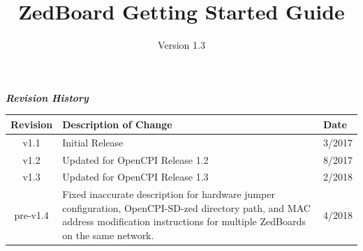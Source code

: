 \def\docTitle{ZedBoard Getting Started Guide}
\def\docVersion{1.3}

\date{Version \docVersion} %
\title{\docTitle}
\usepackage[T1]{fontenc} %
\usepackage{graphicx}
\graphicspath{ {figures/} }

\maketitle
\newpage

	\begin{center}
	\textit{\textbf{Revision History}}
		\begin{table}[H]
		\label{table:revisions} %
			\begin{tabularx}{\textwidth}{|c|X|l|}
			\hline
			\rowcolor{blue}
			\textbf{Revision} & \textbf{Description of Change} & \textbf{Date} \\
		    \hline
		    v1.1 & Initial Release & 3/2017 \\
            \hline
            v1.2 & Updated for OpenCPI Release 1.2 & 8/2017 \\
            \hline
            v1.3 & Updated for OpenCPI Release 1.3 & 2/2018 \\
            \hline
            pre-v1.4 & Fixed inaccurate description for hardware jumper configuration, OpenCPI-SD-zed directory path, and MAC address modification instructions for multiple ZedBoards on the same network. & 4/2018 \\
            \hline
			\end{tabularx}
		\end{table}
	\end{center}

